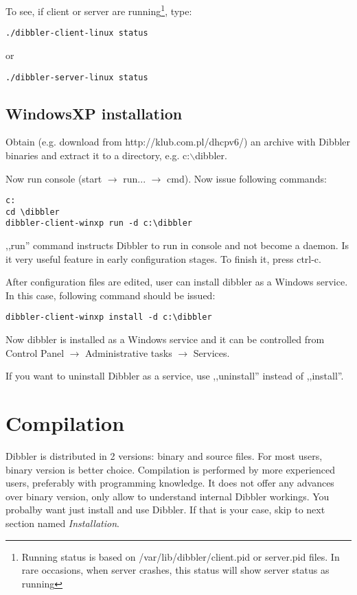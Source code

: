 To see, if client or server are running\footnote{Running status is
  based on /var/lib/dibbler/client.pid or server.pid files. In rare
  occasions, when server crashes, this status will show server status as running}, type:
\begin{verbatim}
./dibbler-client-linux status
\end{verbatim}

or
\begin{verbatim}
./dibbler-server-linux status
\end{verbatim}

\subsection{WindowsXP installation}
Obtain (e.g. download from http://klub.com.pl/dhcpv6/) an archive with
Dibbler binaries and extract it to a directory, e.g. c:$\backslash$dibbler.

Now run console (start $\rightarrow$ run... $\rightarrow$ cmd). Now
issue following commands:

\begin{verbatim}
c:
cd \dibbler
dibbler-client-winxp run -d c:\dibbler
\end{verbatim}

,,run'' command instructs Dibbler to run in console and not become a
daemon. Is it very useful feature in early configuration stages. To
finish it, press ctrl-c. 

After configuration files are edited, user can install dibbler as a
Windows service. In this case, following command should be issued:
\begin{verbatim}
dibbler-client-winxp install -d c:\dibbler
\end{verbatim}

Now dibbler is installed as a Windows service and it can be controlled
from Control Panel $\rightarrow$ Administrative tasks $\rightarrow$
Services. 

If you want to uninstall Dibbler as a service, use ,,uninstall''
instead of ,,install''.

\section{Compilation}
Dibbler is distributed in 2 versions: binary and source files. For
most users, binary version is better choice.  Compilation is
performed by more experienced users, preferably with programming
knowledge. It does not offer any advances over binary version, only
allow to understand internal Dibbler workings. You probalby want just
install and use Dibbler. If that is your case, skip to next section
named \emph{Installation}.

